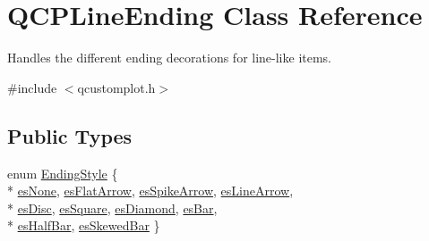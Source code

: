 \hypertarget{class_q_c_p_line_ending}{\section{Q\-C\-P\-Line\-Ending Class Reference}
\label{class_q_c_p_line_ending}
}


Handles the different ending decorations for line-\/like items.  




{\ttfamily \#include $<$qcustomplot.\-h$>$}

\subsection*{Public Types}
\begin{DoxyCompactItemize}
\item 
enum \hyperlink{class_q_c_p_line_ending_a5ef16e6876b4b74959c7261d8d4c2cd5}{Ending\-Style} \{ \\*
\hyperlink{class_q_c_p_line_ending_a5ef16e6876b4b74959c7261d8d4c2cd5aca12d500f50cd6871766801bac30fb03}{es\-None}, 
\hyperlink{class_q_c_p_line_ending_a5ef16e6876b4b74959c7261d8d4c2cd5a3d7dcea2f100671727c3417142154f8f}{es\-Flat\-Arrow}, 
\hyperlink{class_q_c_p_line_ending_a5ef16e6876b4b74959c7261d8d4c2cd5ab9964d0d03f812d1e79de15edbeb2cbf}{es\-Spike\-Arrow}, 
\hyperlink{class_q_c_p_line_ending_a5ef16e6876b4b74959c7261d8d4c2cd5a61f78ee8f375fb21cb9d250687bbcbd2}{es\-Line\-Arrow}, 
\\*
\hyperlink{class_q_c_p_line_ending_a5ef16e6876b4b74959c7261d8d4c2cd5ae5a3414916817258bcc6dddd605e8f5c}{es\-Disc}, 
\hyperlink{class_q_c_p_line_ending_a5ef16e6876b4b74959c7261d8d4c2cd5ae1836502fa43d8990bb62b2d493a140a}{es\-Square}, 
\hyperlink{class_q_c_p_line_ending_a5ef16e6876b4b74959c7261d8d4c2cd5a378fe5a8b768411b0bc1765210fe7200}{es\-Diamond}, 
\hyperlink{class_q_c_p_line_ending_a5ef16e6876b4b74959c7261d8d4c2cd5a2cf543bbca332df26d89bf779f50469f}{es\-Bar}, 
\\*
\hyperlink{class_q_c_p_line_ending_a5ef16e6876b4b74959c7261d8d4c2cd5a126c390f0c359fcd8df1fc5e38d26d5b}{es\-Half\-Bar}, 
\hyperlink{class_q_c_p_line_ending_a5ef16e6876b4b74959c7261d8d4c2cd5a2b2cc96e757ca9bcd91fb70221ed43ab}{es\-Skewed\-Bar}
 \}
\end{DoxyCompactItemize}
